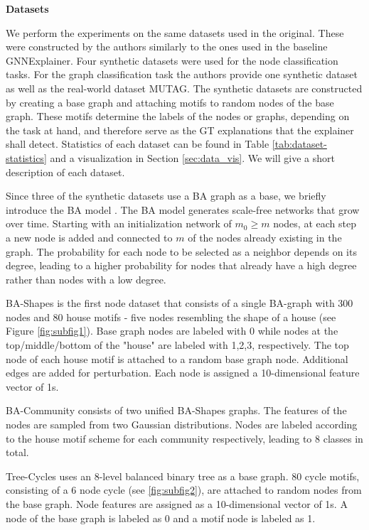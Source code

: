 \textbf{Datasets}\par
We perform the experiments on the same datasets used in the original. These were constructed by the authors similarly to the ones used in the baseline GNNExplainer. Four synthetic datasets were used for the node classification tasks. For the graph classification task the authors provide one synthetic dataset as well as the real-world dataset MUTAG. The synthetic datasets are constructed by creating a base graph and attaching motifs to random nodes of the base graph. These motifs determine the labels of the nodes or graphs, depending on the task at hand, and therefore serve as the \ac{GT} explanations that the explainer shall detect. Statistics of each dataset can be found in Table \ref{tab:dataset-statistics} and a visualization in Section \ref{sec:data_vis}. We will give a short description of each dataset. \bigskip

Since three of the synthetic datasets use a \ac{BA} graph as a base, we briefly introduce the BA model \cite{albert2002statistical}. The BA model generates scale-free networks that grow over time. Starting with an initialization network of $m_0 \geq m$ nodes, at each step a new node is added and connected to $m$ of the nodes already existing in the graph. The probability for each node to be selected as a neighbor depends on its degree, leading to a higher probability for nodes that already have a high degree rather than nodes with a low degree. \bigskip

BA-Shapes is the first node dataset that consists of a single BA-graph with 300 nodes and 80 house motifs - five nodes resembling the shape of a house (see Figure \ref{fig:subfig1}). Base graph nodes are labeled with 0 while nodes at the top/middle/bottom of the "house" are labeled with 1,2,3, respectively. The top node of each house motif is attached to a random base graph node. Additional edges are added for perturbation. Each node is assigned a 10-dimensional feature vector of 1s.

BA-Community consists of two unified BA-Shapes graphs. The features of the nodes are sampled from two Gaussian distributions. Nodes are labeled according to the house motif scheme for each community respectively, leading to 8 classes in total.

Tree-Cycles uses an 8-level balanced binary tree as a base graph. 80 cycle motifs, consisting of a 6 node cycle (see \ref{fig:subfig2}), are attached to random nodes from the base graph. Node features are assigned as a 10-dimensional vector of 1s. A node of the base graph is labeled as 0 and a motif node is labeled as 1.

